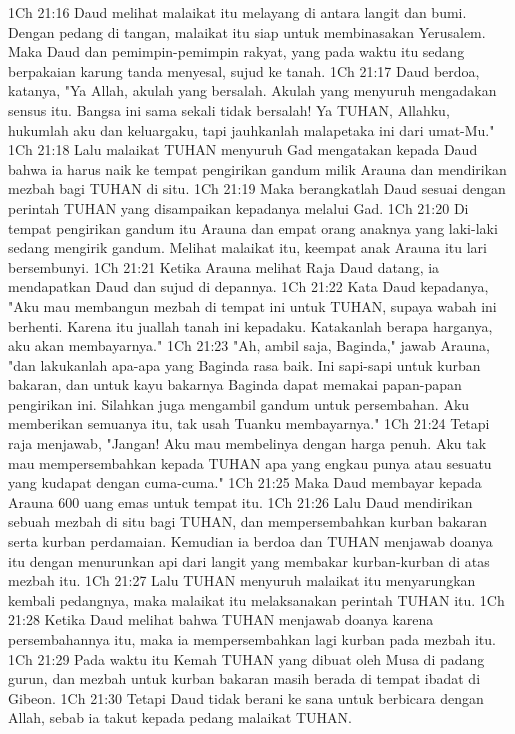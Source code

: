 1Ch 21:16  Daud melihat malaikat itu melayang di antara langit dan bumi. Dengan pedang di tangan, malaikat itu siap untuk membinasakan Yerusalem. Maka Daud dan pemimpin-pemimpin rakyat, yang pada waktu itu sedang berpakaian karung tanda menyesal, sujud ke tanah.
1Ch 21:17  Daud berdoa, katanya, "Ya Allah, akulah yang bersalah. Akulah yang menyuruh mengadakan sensus itu. Bangsa ini sama sekali tidak bersalah! Ya TUHAN, Allahku, hukumlah aku dan keluargaku, tapi jauhkanlah malapetaka ini dari umat-Mu."
1Ch 21:18  Lalu malaikat TUHAN menyuruh Gad mengatakan kepada Daud bahwa ia harus naik ke tempat pengirikan gandum milik Arauna dan mendirikan mezbah bagi TUHAN di situ.
1Ch 21:19  Maka berangkatlah Daud sesuai dengan perintah TUHAN yang disampaikan kepadanya melalui Gad.
1Ch 21:20  Di tempat pengirikan gandum itu Arauna dan empat orang anaknya yang laki-laki sedang mengirik gandum. Melihat malaikat itu, keempat anak Arauna itu lari bersembunyi.
1Ch 21:21  Ketika Arauna melihat Raja Daud datang, ia mendapatkan Daud dan sujud di depannya.
1Ch 21:22  Kata Daud kepadanya, "Aku mau membangun mezbah di tempat ini untuk TUHAN, supaya wabah ini berhenti. Karena itu juallah tanah ini kepadaku. Katakanlah berapa harganya, aku akan membayarnya."
1Ch 21:23  "Ah, ambil saja, Baginda," jawab Arauna, "dan lakukanlah apa-apa yang Baginda rasa baik. Ini sapi-sapi untuk kurban bakaran, dan untuk kayu bakarnya Baginda dapat memakai papan-papan pengirikan ini. Silahkan juga mengambil gandum untuk persembahan. Aku memberikan semuanya itu, tak usah Tuanku membayarnya."
1Ch 21:24  Tetapi raja menjawab, "Jangan! Aku mau membelinya dengan harga penuh. Aku tak mau mempersembahkan kepada TUHAN apa yang engkau punya atau sesuatu yang kudapat dengan cuma-cuma."
1Ch 21:25  Maka Daud membayar kepada Arauna 600 uang emas untuk tempat itu.
1Ch 21:26  Lalu Daud mendirikan sebuah mezbah di situ bagi TUHAN, dan mempersembahkan kurban bakaran serta kurban perdamaian. Kemudian ia berdoa dan TUHAN menjawab doanya itu dengan menurunkan api dari langit yang membakar kurban-kurban di atas mezbah itu.
1Ch 21:27  Lalu TUHAN menyuruh malaikat itu menyarungkan kembali pedangnya, maka malaikat itu melaksanakan perintah TUHAN itu.
1Ch 21:28  Ketika Daud melihat bahwa TUHAN menjawab doanya karena persembahannya itu, maka ia mempersembahkan lagi kurban pada mezbah itu.
1Ch 21:29  Pada waktu itu Kemah TUHAN yang dibuat oleh Musa di padang gurun, dan mezbah untuk kurban bakaran masih berada di tempat ibadat di Gibeon.
1Ch 21:30  Tetapi Daud tidak berani ke sana untuk berbicara dengan Allah, sebab ia takut kepada pedang malaikat TUHAN.
